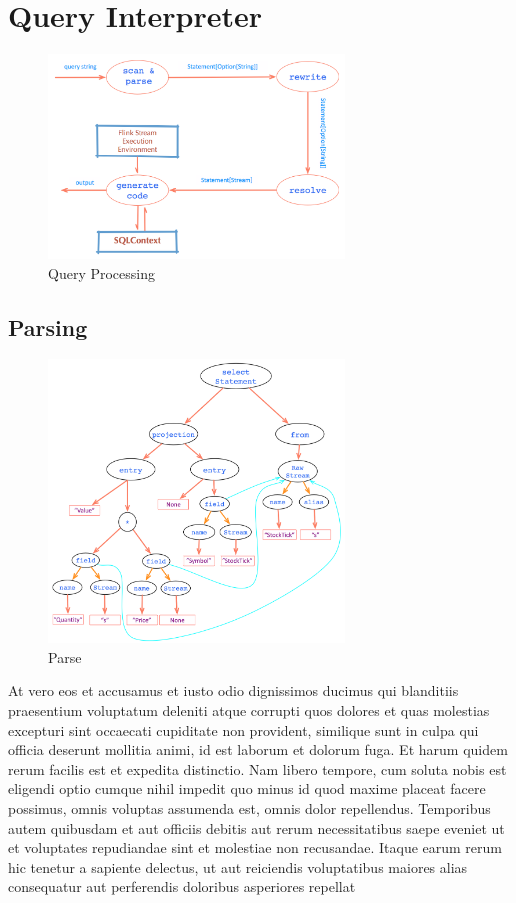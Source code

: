 \section{Query Interpreter}
\begin{figure}[h!] 
\centering    
\includegraphics[width=0.7\textwidth]{QueryProcessing}
\caption{Query Processing}
\label{fig:QueryProcessing}
\end{figure}



\subsection{Parsing}

\begin{figure}[h!] 
\centering    
\includegraphics[width=0.7\textwidth]{Parse}
\caption{Parse}
\label{fig:Parse}
\end{figure}

At vero eos et accusamus et iusto odio dignissimos ducimus qui blanditiis praesentium voluptatum deleniti atque corrupti quos dolores et quas molestias excepturi sint occaecati cupiditate non provident, similique sunt in culpa qui officia deserunt mollitia animi, id est laborum et dolorum fuga. Et harum quidem rerum facilis est et expedita distinctio. Nam libero tempore, cum soluta nobis est eligendi optio cumque nihil impedit quo minus id quod maxime placeat facere possimus, omnis voluptas assumenda est, omnis dolor repellendus. Temporibus autem quibusdam et aut officiis debitis aut rerum necessitatibus saepe eveniet ut et voluptates repudiandae sint et molestiae non recusandae. Itaque earum rerum hic tenetur a sapiente delectus, ut aut reiciendis voluptatibus maiores alias consequatur aut perferendis doloribus asperiores repellat

